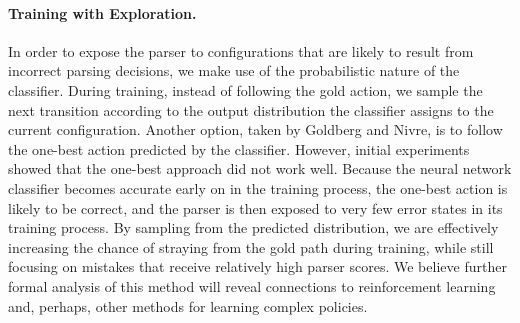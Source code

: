 \documentclass[11pt]{article}
\newcommand{\nascomment}[1]{\textcolor{blue}{\textbf{[#1 --\textsc{nas}]}}}
\newcommand{\ygcomment}[1]{\textcolor{red}{\textbf{[#1 --\textsc{yg}]}}}
\begin{document}
\paragraph{Training with Exploration.} In order to expose the parser to configurations that are likely to result from
incorrect parsing decisions, we make use of the probabilistic nature of the
classifier.
During training, instead of following the gold action, 
we sample the next transition according to
the output distribution the classifier assigns to the current
configuration. Another option, taken by Goldberg and Nivre, is to
follow the one-best action predicted by the classifier.  However, initial
experiments showed that the one-best approach did not work well. Because the
neural network classifier becomes accurate early on in the training process, the
one-best action is likely to be correct, and the parser is then exposed to very
few error states in its training process. By sampling from the predicted
distribution, we are effectively increasing the chance of straying from the gold
path during training, while still focusing on mistakes that receive relatively
high parser scores.
We believe further formal analysis of this method will reveal
connections to reinforcement learning and, perhaps, other methods for
learning complex policies.
\end{document}
